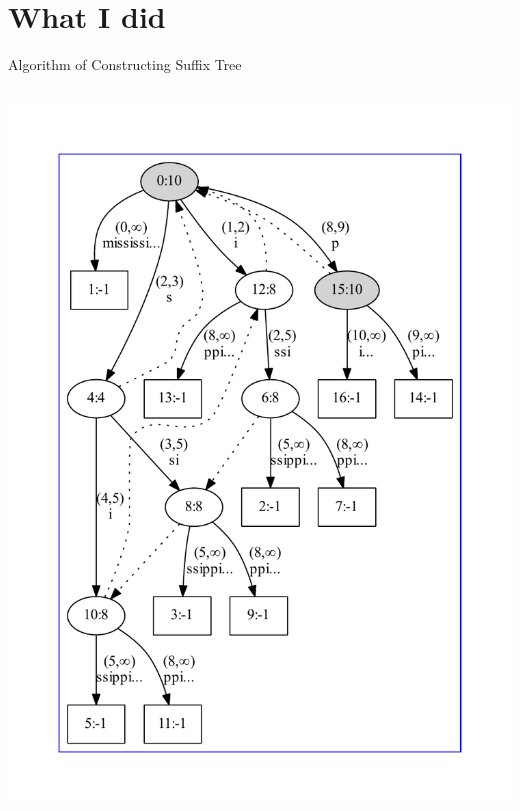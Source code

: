 \section{What I did} 

\begin{frame}{Algorithm of Constructing Suffix Tree}%
\begin{columns}%
\includegraphics[width=\textwidth]{mississippi.pdf}


\end{columns}
\end{frame}
